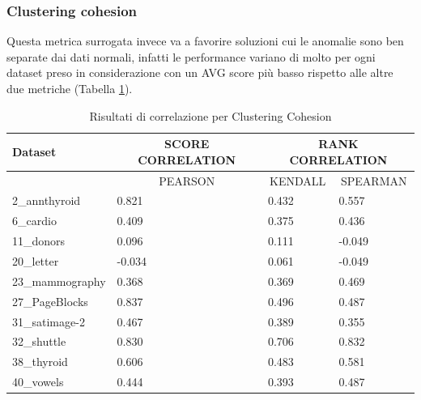 \newpage
\subsubsection{Clustering cohesion}
Questa metrica surrogata invece va a favorire soluzioni cui le anomalie sono ben separate dai dati normali, infatti le performance variano di molto per ogni dataset preso in considerazione con un AVG score più basso rispetto alle altre due metriche (Tabella \ref{cc-results}).


\begin{table}[]
	\caption{\label{cc-results}Risultati di correlazione per Clustering Cohesion}
		\begin{tabular}{|l|l|l|l|}
			\hline
			Dataset         & \multicolumn{1}{c|}{SCORE CORRELATION} & \multicolumn{2}{c|}{RANK CORRELATION}                         \\  \hline
			                & \multicolumn{1}{c|}{PEARSON} & \multicolumn{1}{c|}{KENDALL} & \multicolumn{1}{c|}{SPEARMAN} \\ \hline
			2\_annthyroid   & 0.821                        & 0.432                        & 0.557                         \\ \hline
			6\_cardio       & 0.409                        & 0.375                        & 0.436                         \\ \hline
			11\_donors      & 0.096                        & 0.111                        & -0.049                        \\ \hline
			20\_letter      & -0.034                       & 0.061                        & -0.049                        \\ \hline
			23\_mammography & 0.368                        & 0.369                        & 0.469                         \\ \hline
			27\_PageBlocks  & 0.837                        & 0.496                        & 0.487                         \\ \hline
			31\_satimage-2  & 0.467                        & 0.389                        & 0.355                         \\ \hline
			32\_shuttle     & 0.830                        & 0.706                        & 0.832                         \\ \hline
			38\_thyroid     & 0.606                        & 0.483                        & 0.581                         \\ \hline
			40\_vowels      & 0.444                        & 0.393                        & 0.487                         \\ \hline

\end{tabular}
\end{table}
